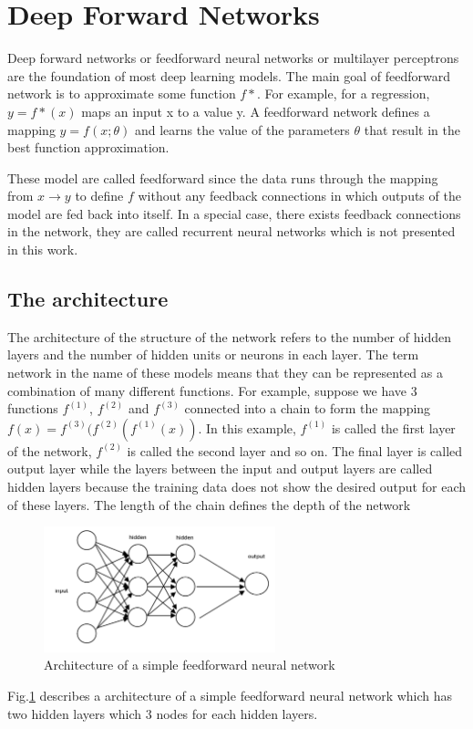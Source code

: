\section{Deep Forward Networks}
\hspace{0.45cm} Deep forward networks or feedforward neural networks or multilayer perceptrons are the foundation 
of most deep learning models\cite{Goodfellow-et-al-2016}. The main goal of feedforward network is to 
approximate some function $f*$. 
For example, for a regression, $y = f*(x)$ maps an input x to a value y. 
A feedforward network defines a mapping $y = f(x;\theta)$ and learns the value of the parameters $\theta$ that result in the best function approximation.\par
These model are called feedforward since the data runs through the mapping from $x \rightarrow y$ to define $f$ without any feedback connections in which outputs of the model are fed back into itself\cite{Goodfellow-et-al-2016}.
 In a special case, there exists feedback connections in the network, they are called recurrent neural networks which is not presented in this work.

\subsection{The architecture}
\hspace{0.45cm}The architecture of the structure of the network refers to the number of hidden layers 
and the number of hidden units or neurons in each layer. 
The term network in the name of these models means that they can be represented as a combination of many different functions\cite{Goodfellow-et-al-2016}. For example, suppose we have 3 functions $f^{(1)}$, $f^{(2)}$ and $f^{(3)}$ connected into a chain to form the mapping $f(x) = f^{(3)}(f^{(2)}(f^{(1)}(x))$. In this example, $f^{(1)}$ is called the first layer of the network, $f^{(2)}$ is called the second layer and so on. The final layer is called output layer while the layers between the input and output layers are called hidden layers because the training data does not show the desired output for each of these layers. The length of the chain defines the depth of the network
\begin{figure}[h!]
    \centering
    \includegraphics[width=0.6\textwidth]{Chapters/Fig/architecture_mlp.png}
    \caption{Architecture of a simple feedforward neural network}
    \label{fig:arch_mlp}
\end{figure}
\par Fig.\ref{fig:arch_mlp} describes a architecture of a simple feedforward neural network which has two hidden layers which 3 nodes for each hidden layers.
